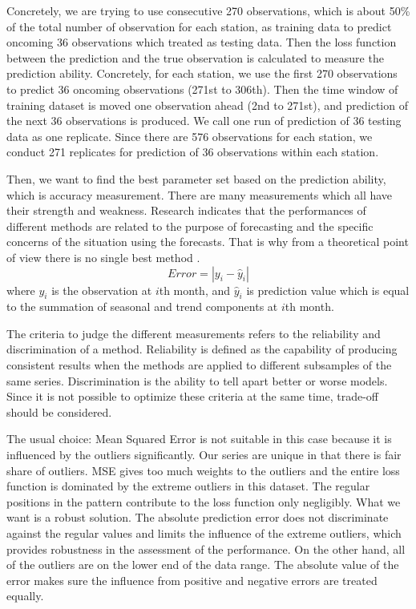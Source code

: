 Concretely, we are trying to use consecutive 270 observations, which is about 
50\% of the total number of observation for each station, as training 
data to predict oncoming 36 observations which treated as testing data. Then the 
loss function between the prediction and the true observation is calculated to 
measure the prediction ability. Concretely, for 
each station, we use the first 270 observations to predict 36 oncoming 
observations (271st to 306th). Then the time window of training dataset is moved 
one observation ahead (2nd to 271st), and prediction of the next 36 observations 
is produced. We call one run of prediction of 36 testing data as one replicate. 
Since there are 576 observations for each station, we conduct 271 replicates for 
prediction of 36 observations within each station.

Then, we want to find the best parameter set based on the prediction ability,
which is accuracy measurement. 
There are many measurements which all have their strength and weakness. 
Research indicates that the performances of different methods are related to the
purpose of forecasting and the specific concerns of the situation using the 
forecasts. 
That is why from a theoretical point of view there is no single best method 
\cite{brockwell2002introduction}.
$$
Error = | y_i - \hat y_i |
$$
where $y_i$ is the observation at $i$th month, and $\hat y_i$ is prediction value
which is equal to the summation of seasonal and trend components at $i$th month.

The criteria to judge the different measurements refers to the reliability and
discrimination of a method. Reliability is defined as the capability of producing 
consistent results when the methods are applied to different subsamples of the 
same series. Discrimination is the ability to tell apart better or worse models. 
Since it is not possible to optimize these criteria at the same time, trade-off 
should be considered.

The usual choice: 
Mean Squared Error is not suitable in this case because it is influenced by the 
outliers significantly. Our series are unique in that there is fair share of 
outliers. MSE gives too much weights to the outliers and the entire loss function is
dominated by the extreme outliers in this dataset. The regular positions in the 
pattern contribute to the loss function only negligibly. What we want is a robust
solution. The absolute prediction error does not discriminate against the regular
values and limits the influence of the extreme outliers, which provides robustness 
in the assessment of the performance. On the other hand, all of the outliers are 
on the lower end of the data range. The absolute value of the error makes sure 
the influence from positive and negative errors are treated equally.

